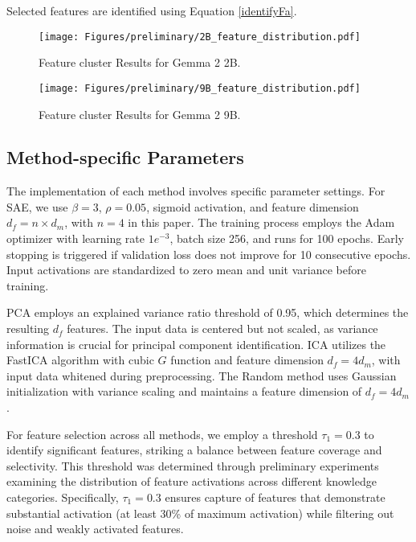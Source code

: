Selected features are identified using Equation \ref{identifyFa}.


\begin{figure*}
    \centering
    \texttt{[image: Figures/preliminary/2B\_feature\_distribution.pdf]}
\caption{Feature cluster Results for Gemma 2 2B.}
    \label{fig:appendix: 2B_feature_distribution}
\end{figure*}
\begin{figure*}
    \centering
    \texttt{[image: Figures/preliminary/9B\_feature\_distribution.pdf]}
\caption{Feature cluster Results for Gemma 2 9B.}
    \label{fig:appendix: 9B_feature_distribution}
\end{figure*}

\subsection{Method-specific Parameters}
\label{subsection:appendix,Method-specific Parameters}
The implementation of each method involves specific parameter settings. For SAE, we use $\beta = 3$, $\rho = 0.05$, sigmoid activation, and feature dimension $d_f = n \times d_m$, with $n=4$ in this paper. The training process employs the Adam optimizer with learning rate $1e^{-3}$, batch size 256, and runs for 100 epochs. Early stopping is triggered if validation loss does not improve for 10 consecutive epochs. Input activations are standardized to zero mean and unit variance before training.

PCA employs an explained variance ratio threshold of 0.95, which determines the resulting $d_f$ features. The input data is centered but not scaled, as variance information is crucial for principal component identification. ICA utilizes the FastICA algorithm with cubic $G$ function and feature dimension $d_f = 4d_m$, with input data whitened during preprocessing. The Random method uses Gaussian initialization with variance scaling and maintains a feature dimension of $d_f = 4d_m$.

For feature selection across all methods, we employ a threshold $\tau_1 = 0.3$ to identify significant features, striking a balance between feature coverage and selectivity. This threshold was determined through preliminary experiments examining the distribution of feature activations across different knowledge categories. Specifically, $\tau_1 = 0.3$ ensures capture of features that demonstrate substantial activation (at least 30\% of maximum activation) while filtering out noise and weakly activated features.


